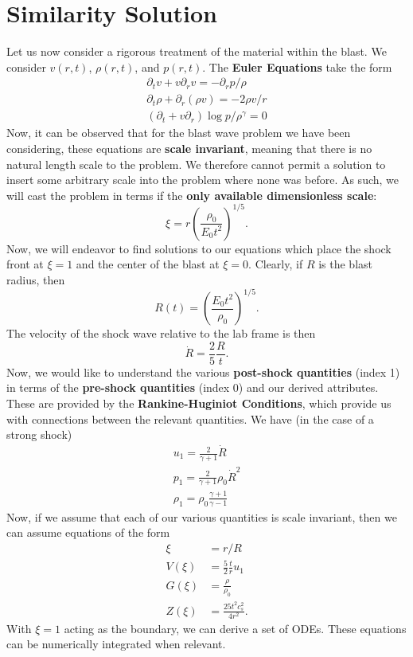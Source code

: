 \section{Similarity Solution}
Let us now consider a rigorous treatment of the material within the blast. We consider $v(r,t)$, $\rho(r,t)$, and $p(r,t)$. The \textbf{Euler Equations} take the form
\[
\begin{aligned}
    \partial_t v + v\partial_r v = -\partial_rp / \rho\\
    \partial_t \rho + \partial_r (\rho v) = - 2\rho v/r\\
    \left(\partial_t + v\partial_r\right) \log p / \rho^\gamma = 0
\end{aligned}
\]
 Now, it can be observed that for the blast wave problem we have been considering, these equations are \textbf{scale invariant}, meaning that there is no natural length scale to the problem. We therefore cannot permit a solution to insert some arbitrary scale into the problem where none was before. As such, we will cast the problem in terms if the \textbf{only available dimensionless scale}:
\[
\xi = r \left(\frac{\rho_0}{E_0t^2}\right)^{1/5}.
\]
Now, we will endeavor to find solutions to our equations which place the shock front at $\xi = 1$ and the
center of the blast at $\xi = 0$. Clearly, if $R$ is the blast radius, then
\[
R(t) = \left(\frac{E_0t^2}{\rho_0}\right)^{1/5}.
\]
The velocity of the shock wave relative to the lab frame is then
\[
\dot{R} = \frac{2}{5} \frac{R}{t}. 
\]
Now, we would like to understand the various \textbf{post-shock quantities} (index 1) in terms of the \textbf{pre-shock quantities} (index 0) and our derived attributes. These are provided by the \textbf{Rankine-Huginiot Conditions}, which provide us with connections between the relevant quantities. We have (in the case of a strong shock)
\[
\begin{aligned}
    u_1 = \frac{2}{\gamma +1} \dot{R}\\
    p_1 = \frac{2}{\gamma +1} \rho_0 \dot{R}^2\\
    \rho_1 = \rho_0 \frac{\gamma +1}{\gamma -1}
\end{aligned}
\]
Now, if we assume that each of our various quantities is scale invariant, then we can assume equations of the form
\[
\begin{aligned}
    \xi &= r/R\\
    V(\xi) &= \frac{5}{2}\frac{t}{r} u_1\\
    G(\xi) &= \frac{\rho}{\rho_0}\\
    Z(\xi) &= \frac{25 t^2 c_s^2}{4r^2}.
\end{aligned}
\]
 With $\xi = 1$ acting as the boundary, we can derive a set of ODEs. These equations can be numerically integrated when relevant.

